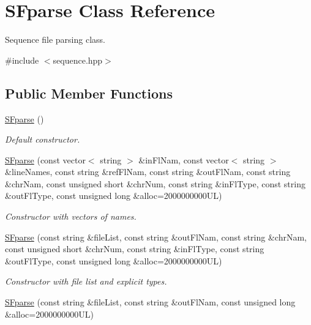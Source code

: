 \hypertarget{class_s_fparse}{}\section{S\+Fparse Class Reference}
\label{class_s_fparse}


Sequence file parsing class.  




{\ttfamily \#include $<$sequence.\+hpp$>$}

\subsection*{Public Member Functions}
\begin{DoxyCompactItemize}
\item 
\mbox{\label{class_s_fparse_a6199b21081670322a0b0d7bbfeceb9a9}} 
\hyperlink{class_s_fparse_a6199b21081670322a0b0d7bbfeceb9a9}{S\+Fparse} ()
\begin{DoxyCompactList}\small\item\em Default constructor. \end{DoxyCompactList}\item 
\hyperlink{class_s_fparse_a63162a0c3d8c855602796198854eb36f}{S\+Fparse} (const vector$<$ string $>$ \&in\+Fl\+Nam, const vector$<$ string $>$ \&line\+Names, const string \&ref\+Fl\+Nam, const string \&out\+Fl\+Nam, const string \&chr\+Nam, const unsigned short \&chr\+Num, const string \&in\+Fl\+Type, const string \&out\+Fl\+Type, const unsigned long \&alloc=2000000000\+U\+L)
\begin{DoxyCompactList}\small\item\em Constructor with vectors of names. \end{DoxyCompactList}\item 
\hyperlink{class_s_fparse_aa66f34c1f0db7451a191461f3f303137}{S\+Fparse} (const string \&file\+List, const string \&out\+Fl\+Nam, const string \&chr\+Nam, const unsigned short \&chr\+Num, const string \&in\+Fl\+Type, const string \&out\+Fl\+Type, const unsigned long \&alloc=2000000000\+U\+L)
\begin{DoxyCompactList}\small\item\em Constructor with file list and explicit types. \end{DoxyCompactList}\item 
\hyperlink{class_s_fparse_a7adee31d2eaa489b64e25f690348ce99}{S\+Fparse} (const string \&file\+List, const string \&out\+Fl\+Nam, const unsigned long \&alloc=2000000000\+U\+L)

\end{DoxyCompactItemize}
